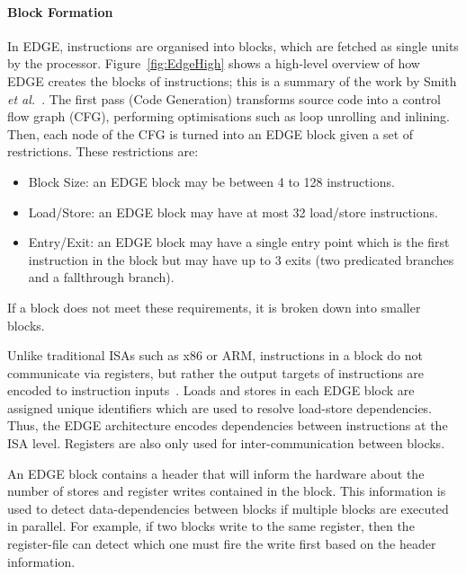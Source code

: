 \paragraph*{Block Formation}
In EDGE, instructions are organised into blocks, which are fetched as single units by the processor.
Figure~\ref{fig:EdgeHigh} shows a high-level overview of how EDGE creates the blocks of instructions; this is a summary of the work by Smith {\it et al.~}\cite{smith2006edge}. 
The first pass (Code Generation) transforms source code into a control flow graph (CFG), performing optimisations such as loop unrolling and inlining.
Then, each node of the CFG is turned into an EDGE block given a set of restrictions.
These restrictions are:
\begin{itemize}
\item Block Size: an EDGE block may be between 4 to 128 instructions.
\vspace{-1em}
\item Load/Store: an EDGE block may have at most 32 load/store instructions.
\vspace{-1em}
\item Entry/Exit: an EDGE block may have a single entry point which is the first instruction in the block but may have up to 3 exits (two predicated branches and a fallthrough branch).
\end{itemize}
If a block does not meet these requirements, it is broken down into smaller blocks.

Unlike traditional ISAs such as x86 or ARM, instructions in a block do not communicate via registers, but rather the output targets of instructions are encoded to instruction inputs~\cite{smith2006edge}.
Loads and stores in each EDGE block are assigned unique identifiers which are used to resolve load-store dependencies.
Thus, the EDGE architecture encodes dependencies between instructions at the ISA level.
Registers are also only used for inter-communication between blocks.

An EDGE block contains a header that will inform the hardware about the number of stores and register writes contained in the block.
This information is used to detect data-dependencies between blocks if multiple blocks are executed in parallel.
For example, if two blocks write to the same register, then the register-file can detect which one must fire the write first based on the header information. 

